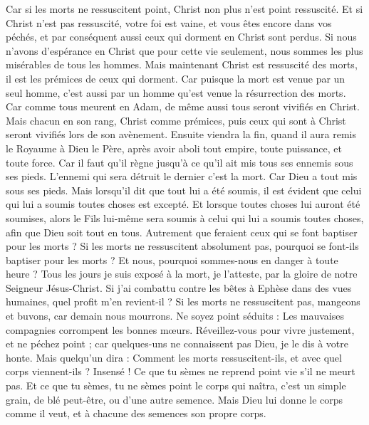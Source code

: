 \begin{multicols}{2}
Car si les morts ne ressuscitent point, Christ non plus n'est point ressuscité.
Et si Christ n'est pas ressuscité, votre foi est vaine, et vous êtes encore dans vos péchés,
et par conséquent aussi ceux qui dorment en Christ sont perdus.
Si nous n'avons d'espérance en Christ que pour cette vie seulement, nous sommes les plus misérables de tous les hommes.
Mais maintenant Christ est ressuscité des morts, il est les prémices de ceux qui dorment.
Car puisque la mort est venue par un seul homme, c’est aussi par un homme qu’est venue la résurrection des morts.
Car comme tous meurent en Adam, de même aussi tous seront vivifiés en Christ.
Mais chacun en son rang, Christ comme prémices, puis ceux qui sont à Christ seront vivifiés lors de son avènement.
Ensuite viendra la fin, quand il aura remis le Royaume à Dieu le Père, après avoir aboli tout empire, toute puissance, et toute force.
Car il faut qu'il règne jusqu'à ce qu'il ait mis tous ses ennemis sous ses pieds.
L'ennemi qui sera détruit le dernier c'est la mort.
Car Dieu a tout mis sous ses pieds. Mais lorsqu’il dit que tout lui a été soumis, il est évident que celui qui lui a soumis toutes choses est excepté.
Et lorsque toutes choses lui auront été soumises, alors le Fils lui-même sera soumis à celui qui lui a soumis toutes choses, afin que Dieu soit tout en tous.
Autrement que feraient ceux qui se font baptiser pour les morts ? Si les morts ne ressuscitent absolument pas, pourquoi se font-ils baptiser pour les morts ?
Et nous, pourquoi sommes-nous en danger à toute heure ?
Tous les jours je suis exposé à la mort, je l’atteste, par la gloire de notre Seigneur Jésus-Christ.
Si j'ai combattu contre les bêtes à Ephèse dans des vues humaines, quel profit m’en revient-il ? Si les morts ne ressuscitent pas, mangeons et buvons, car demain nous mourrons.
Ne soyez point séduits : Les mauvaises compagnies corrompent les bonnes mœurs.
Réveillez-vous pour vivre justement, et ne péchez point ; car quelques-uns ne connaissent pas Dieu, je le dis à votre honte.
Mais quelqu'un dira : Comment les morts ressuscitent-ils, et avec quel corps viennent-ils ?
Insensé ! Ce que tu sèmes ne reprend point vie s'il ne meurt pas.
Et ce que tu sèmes, tu ne sèmes point le corps qui naîtra, c’est un simple grain, de blé peut-être, ou d’une autre semence.
Mais Dieu lui donne le corps comme il veut, et à chacune des semences son propre corps.

\end{multicols}
